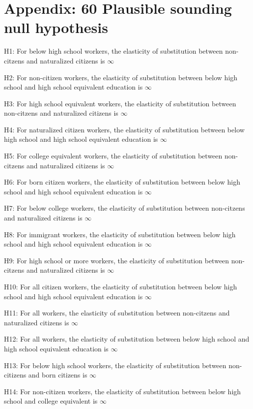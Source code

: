 \documentclass[11pt]{article}
\theoremstyle{definition}
\theoremstyle{remark}
\begin{document}
\section{Appendix: 60 Plausible sounding null hypothesis}

\setlength{\parskip}{0em}

\tiny{
H1: For below high school workers, the elasticity of substitution between non-citzens and naturalized citizens is $\infty$

H2: For non-citizen workers, the elasticity of substitution between below high school and high school equivalent education is $\infty$

H3: For high school equivalent workers, the elasticity of substitution between non-citzens and naturalized citizens is $\infty$

H4: For naturalized citizen workers, the elasticity of substitution between below high school and high school equivalent education is $\infty$

H5: For college equivalent workers, the elasticity of substitution between non-citzens and naturalized citizens is $\infty$

H6: For born citizen workers, the elasticity of substitution between below high school and high school equivalent education is $\infty$

H7: For below college workers, the elasticity of substitution between non-citzens and naturalized citizens is $\infty$

H8: For immigrant workers, the elasticity of substitution between below high school and high school equivalent education is $\infty$

H9: For high school or more workers, the elasticity of substitution between non-citzens and naturalized citizens is $\infty$

H10: For all citizen workers, the elasticity of substitution between below high school and high school equivalent education is $\infty$

H11: For all workers, the elasticity of substitution between non-citzens and naturalized citizens is $\infty$

H12: For all workers, the elasticity of substitution between below high school and high school equivalent education is $\infty$

H13: For below high school workers, the elasticity of substitution between non-citizens and born citizens is $\infty$

H14: For non-citizen workers, the elasticity of substitution between below high school and college equivalent is $\infty$

}
\end{document}
